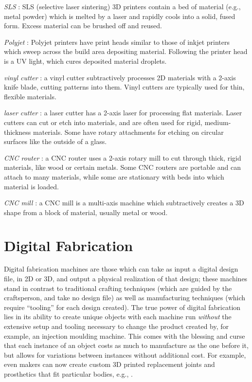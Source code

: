 \emph{SLS} : SLS (selective laser sintering) 3D printers contain a bed of material (e.g., metal powder) which is melted by a laser and rapidly cools into a solid, fused form. Excess material can be brushed off and reused.

\emph{Polyjet} : Polyjet printers have print heads similar to those of inkjet printers which sweep across the build area depositing material. Following the printer head is a UV light, which cures deposited material droplets.

\emph{vinyl cutter} : a vinyl cutter subtractively processes 2D materials with a 2-axis knife blade, cutting patterns into them. Vinyl cutters are typically used for thin, flexible materials.

\emph{laser cutter} : a laser cutter has a 2-axis laser for processing flat materials. Laser cutters can cut or etch into materials, and are often used for rigid, medium-thickness materials. Some have rotary attachments for etching on circular surfaces like the outside of a glass.

\emph{CNC router} : a CNC router uses a 2-axis rotary mill to cut through thick, rigid materials, like wood or certain metals. Some CNC routers are portable and can attach to many materials, while some are stationary with beds into which material is loaded.

\emph{CNC mill} : a CNC mill is a multi-axis machine which subtractively creates a 3D shape from a block of material, usually metal or wood.

\section{Digital Fabrication}

Digital fabrication machines are those which can take as input a digital design file, in 2D or 3D, and output a physical realization of that design; these machines stand in contrast to traditional crafting techniques (which are guided by the craftsperson, and take no design file) as well as manufacturing techniques (which require ``tooling'' for each design created). The true power of digital fabrication lies in its ability to create unique objects with each machine run \emph{without} the extensive setup and tooling necessary to change the product created by, for example, an injection moulding machine. This comes with the blessing and curse that each instance of an object costs as much to manufacture as the one before it, but allows for variations between instances without additional cost. For example, even makers can now create custom 3D printed replacement joints and prosthetics that fit particular bodies, e.g., \cite{myers-sophie}.

